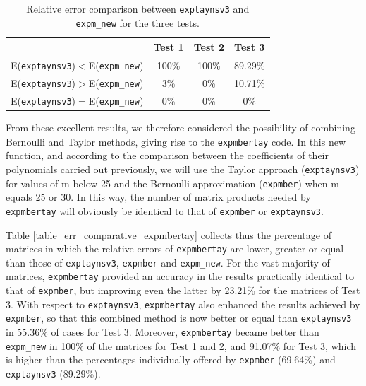 \documentclass[preprint,10pt,numbers,sort&compress]{elsarticle}
\begin{document}
\begin{table}[!t]\begin{center}
                \caption{Relative error comparison between \texttt{exptaynsv3} and \texttt{expm\_new} for the three tests.}
{\footnotesize
               \begin{tabular}{|c||c|c|c|}\hline & Test 1  &Test 2 & Test 3\\\hline
                        E(\texttt{exptaynsv3})$<$E(\texttt{expm\_new})    & 100\% & 100\% & 89.29\%\\\hline
                        E(\texttt{exptaynsv3})$>$E(\texttt{expm\_new})    &   3\% &     0\%  & 10.71\%\\\hline
                        E(\texttt{exptaynsv3})$=$E(\texttt{expm\_new})    &   0\% &     0\%  &       0\%\\\hline
                \end{tabular}}
                \label{table_err_comparative_exptaynsv3}
        \end{center}
\end{table}

From these excellent results, we therefore considered the possibility of combining Bernoulli and Taylor methods, giving rise to the \texttt{expmbertay} code. In this new function, and according to the comparison between the coefficients of their polynomials carried out previously, we will use the Taylor approach (\texttt{exptaynsv3}) for values of m below 25 and the Bernoulli approximation (\texttt{expmber}) when m equals 25 or 30. In this way, the number of matrix products needed by \texttt{expmbertay} will obviously be identical to that of \texttt{expmber} or \texttt{exptaynsv3}. 

Table \ref{table_err_comparative_expmbertay} collects thus the percentage of matrices in which the relative errors of \texttt{expmbertay} are lower, greater or equal than those of \texttt{exptaynsv3}, \texttt{expmber}  and \texttt{expm\_new}.  For the vast majority of matrices, \texttt{expmbertay} provided an accuracy in the results practically identical to that of \texttt{expmber}, but improving even the latter by 23.21\% for the matrices of Test 3. With respect to \texttt{exptaynsv3}, \texttt{expmbertay} also enhanced the results achieved by \texttt{expmber}, so that this combined method is now better or equal than \texttt{exptaynsv3} in 55.36\% of cases for Test 3. Moreover, \texttt{expmbertay} became better than \texttt{expm\_new} in 100\% of the matrices for Test 1 and 2, and 91.07\% for Test 3, which is higher than the percentages individually offered by \texttt{expmber} (69.64\%) and \texttt{exptaynsv3} (89.29\%).
\end{document}
